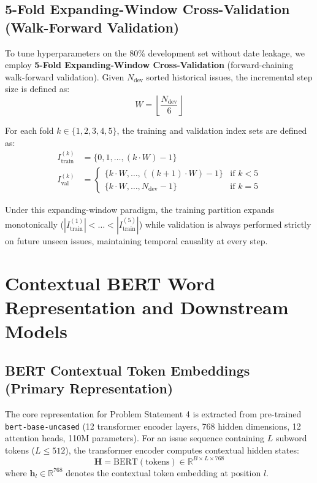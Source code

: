 \documentclass[11pt,a4paper]{article}
\begin{document}
\subsection{5-Fold Expanding-Window Cross-Validation (Walk-Forward Validation)}
To tune hyperparameters on the 80\% development set without date leakage, we employ \textbf{5-Fold Expanding-Window Cross-Validation} (forward-chaining walk-forward validation). Given $N_{\text{dev}}$ sorted historical issues, the incremental step size is defined as:
\begin{equation}
W = \left\lfloor \frac{N_{\text{dev}}}{6} \right\rfloor
\end{equation}

For each fold $k \in \{1, 2, 3, 4, 5\}$, the training and validation index sets are defined as:
\begin{align}
I_{\text{train}}^{(k)} &= \Big\{ 0, 1, \dots, (k \cdot W) - 1 \Big\} \\
I_{\text{val}}^{(k)} &= \begin{cases} 
\Big\{ k \cdot W, \dots, ((k + 1) \cdot W) - 1 \Big\} & \text{if } k < 5 \\
\Big\{ k \cdot W, \dots, N_{\text{dev}} - 1 \Big\} & \text{if } k = 5 
\end{cases}
\end{align}

Under this expanding-window paradigm, the training partition expands monotonically ($|I_{\text{train}}^{(1)}| < \dots < |I_{\text{train}}^{(5)}|$) while validation is always performed strictly on future unseen issues, maintaining temporal causality at every step.

\section{Contextual BERT Word Representation and Downstream Models}
\label{sec:models}

\subsection{BERT Contextual Token Embeddings (Primary Representation)}
The core representation for Problem Statement 4 is extracted from pre-trained \texttt{bert-base-uncased} \cite{devlin2019bert} (12 transformer encoder layers, 768 hidden dimensions, 12 attention heads, 110M parameters). For an issue sequence containing $L$ subword tokens ($L \le 512$), the transformer encoder computes contextual hidden states:
\begin{equation}
\mathbf{H} = \text{BERT}(\text{tokens}) \in \mathbb{R}^{B \times L \times 768}
\end{equation}
where $\mathbf{h}_l \in \mathbb{R}^{768}$ denotes the contextual token embedding at position $l$.
\end{document}
